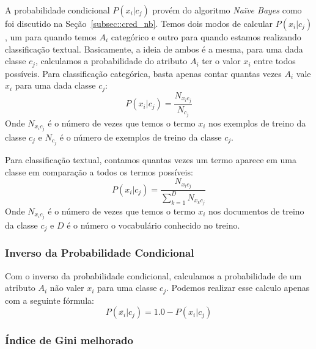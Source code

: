 A probabilidade condicional $P(x_i|c_j)$ provém do algoritmo \textit{Naïve Bayes} como foi discutido na Seção~\ref{subsec::cred_nb}.
Temos dois modos de calcular $P(x_i|c_j)$, um para quando temos $A_i$ categórico e outro para quando estamos realizando classificação textual.
Basicamente, a ideia de ambos é a mesma, para uma dada classe $c_j$, calculamos a probabilidade do atributo $A_i$ ter o valor $x_i$ entre todos possíveis. 
Para classificação categórica, basta apenas contar quantas vezes $A_i$ vale $x_i$ para uma dada classe $c_j$:
    \begin{equation}\label{eqn::nbcattexto}
        P(x_i|c_j) = \frac{ N_{x_{i}c_{j}} }{ N_{c_{j}} } 
    \end{equation}
Onde $N_{x_{i}c_{j}}$ é o número de vezes que temos o termo $x_i$ nos exemplos de treino da classe $c_j$ e $N_{c_{j}}$ é o número de exemplos de treino da classe $c_j$.
        
Para classificação textual, contamos quantas vezes um termo aparece em uma classe em comparação a todos os termos possíveis:
    \begin{equation}\label{eqn::nbcattexto}
        P(x_i|c_j) = \frac{ N_{x_{i}c_{j}} }{ \sum\limits^{D}_{k = 1} {  N_{x_{k}c_{j}}} } 
    \end{equation}
Onde $N_{x_{i}c_{j}}$ é o número de vezes que temos o termo $x_i$ nos documentos de treino da classe $c_j$ e $D$ é o número o vocabulário conhecido no treino.

\subsubsection{Inverso da Probabilidade Condicional}
\label{subsubsection::pc'}
Com o inverso da probabilidade condicional, calculamos a probabilidade de um atributo $A_i$ não valer $x_i$ para uma classe $c_j$. Podemos realizar esse calculo apenas com a seguinte fórmula:
\begin{equation}\label{eqn::plinhattalquec}
   P(\overline{x_i}|c_j) = 1.0 - P(x_i|c_j)
\end{equation}

\subsubsection{Índice de Gini melhorado}
\label{subsubsection::gini}

